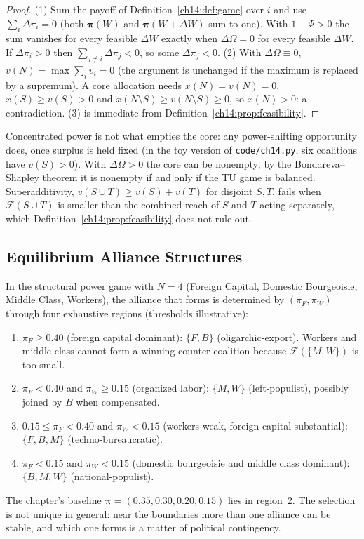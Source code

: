\documentclass[../structural_economics_book.tex]{subfiles}
\begin{document}
\begin{proof}
(1) Sum the payoff of Definition~\ref{ch14:def:game} over $i$ and use $\sum_i\Delta\pi_i = 0$ (both $\boldsymbol{\pi}(W)$ and $\boldsymbol{\pi}(W+\Delta W)$ sum to one). With $1 + \Psi > 0$ the sum vanishes for every feasible $\Delta W$ exactly when $\Delta\Omega = 0$ for every feasible $\Delta W$. If $\Delta\pi_i > 0$ then $\sum_{j\neq i}\Delta\pi_j < 0$, so some $\Delta\pi_j < 0$. (2) With $\Delta\Omega \equiv 0$, $v(N) = \max \sum_i v_i = 0$ (the argument is unchanged if the maximum is replaced by a supremum). A core allocation needs $x(N) = v(N) = 0$, $x(S) \geq v(S) > 0$ and $x(N \setminus S) \geq v(N\setminus S) \geq 0$, so $x(N) > 0$: a contradiction. (3) is immediate from Definition~\ref{ch14:prop:feasibility}.
\end{proof}

Concentrated power is not what empties the core: any power-shifting opportunity does, once surplus is held fixed (in the toy version of \texttt{code/ch14.py}, six coalitions have $v(S) > 0$). With $\Delta\Omega > 0$ the core can be nonempty; by the Bondareva--Shapley theorem it is nonempty if and only if the TU game is balanced. Superadditivity, $v(S \cup T) \geq v(S) + v(T)$ for disjoint $S, T$, fails when $\mathcal{F}(S \cup T)$ is smaller than the combined reach of $S$ and $T$ acting separately, which Definition~\ref{ch14:prop:feasibility} does not rule out.


\subsection{Equilibrium Alliance Structures}

\begin{conjecture}\label{ch14:thm:equilibrium}
In the structural power game with $N = 4$ (Foreign Capital, Domestic Bourgeoisie, Middle Class, Workers), the alliance that forms is determined by $(\pi_F, \pi_W)$ through four exhaustive regions (thresholds illustrative):
\begin{enumerate}
\item $\pi_F \geq 0.40$ (foreign capital dominant): $\{F, B\}$ (oligarchic-export). Workers and middle class cannot form a winning counter-coalition because $\mathcal{F}(\{M, W\})$ is too small.
\item $\pi_F < 0.40$ and $\pi_W \geq 0.15$ (organized labor): $\{M, W\}$ (left-populist), possibly joined by $B$ when compensated.
\item $0.15 \leq \pi_F < 0.40$ and $\pi_W < 0.15$ (workers weak, foreign capital substantial): $\{F, B, M\}$ (techno-bureaucratic).
\item $\pi_F < 0.15$ and $\pi_W < 0.15$ (domestic bourgeoisie and middle class dominant): $\{B, M, W\}$ (national-populist).
\end{enumerate}
The chapter's baseline $\boldsymbol{\pi} = (0.35, 0.30, 0.20, 0.15)$ lies in region~2. The selection is not unique in general: near the boundaries more than one alliance can be stable, and which one forms is a matter of political contingency.
\end{conjecture}
\end{document}
